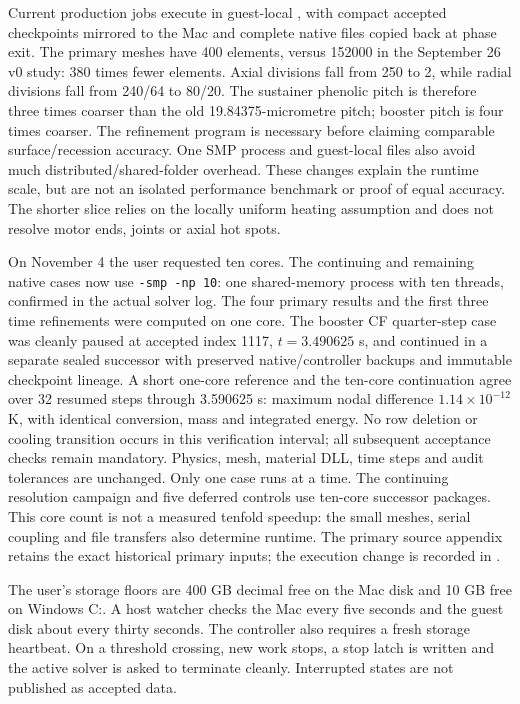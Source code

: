 \documentclass[oneside,openany]{amsdtx}
\begin{document}
Current production jobs execute in guest-local , with compact accepted checkpoints mirrored to the Mac and complete native files copied back at phase exit. The primary meshes have 400 elements, versus 152000 in the September 26 v0 study: 380 times fewer elements. Axial divisions fall from 250 to 2, while radial divisions fall from 240/64 to 80/20. The sustainer phenolic pitch is therefore three times coarser than the old 19.84375-micrometre pitch; booster pitch is four times coarser. The refinement program is necessary before claiming comparable surface/recession accuracy. One SMP process and guest-local files also avoid much distributed/shared-folder overhead. These changes explain the runtime scale, but are not an isolated performance benchmark or proof of equal accuracy. The shorter slice relies on the locally uniform heating assumption and does not resolve motor ends, joints or axial hot spots.

On November 4 the user requested ten cores. The continuing and remaining native cases now use \texttt{-smp -np 10}: one shared-memory process with ten threads, confirmed in the actual solver log. The four primary results and the first three time refinements were computed on one core. The booster CF quarter-step case was cleanly paused at accepted index 1117, $t=3.490625$ s, and continued in a separate sealed successor with preserved native/controller backups and immutable checkpoint lineage. A short one-core reference and the ten-core continuation agree over 32 resumed steps through 3.590625 s: maximum nodal difference $1.14\times10^{-12}$ K, with identical conversion, mass and integrated energy. No row deletion or cooling transition occurs in this verification interval; all subsequent acceptance checks remain mandatory. Physics, mesh, material DLL, time steps and audit tolerances are unchanged. Only one case runs at a time. The continuing resolution campaign and five deferred controls use ten-core successor packages. This core count is not a measured tenfold speedup: the small meshes, serial coupling and file transfers also determine runtime. The primary source appendix retains the exact historical primary inputs; the execution change is recorded in .

The user's storage floors are 400 GB decimal free on the Mac disk and 10 GB free on Windows C:. A host watcher checks the Mac every five seconds and the guest disk about every thirty seconds. The controller also requires a fresh storage heartbeat. On a threshold crossing, new work stops, a stop latch is written and the active solver is asked to terminate cleanly. Interrupted states are not published as accepted data.
\end{document}
